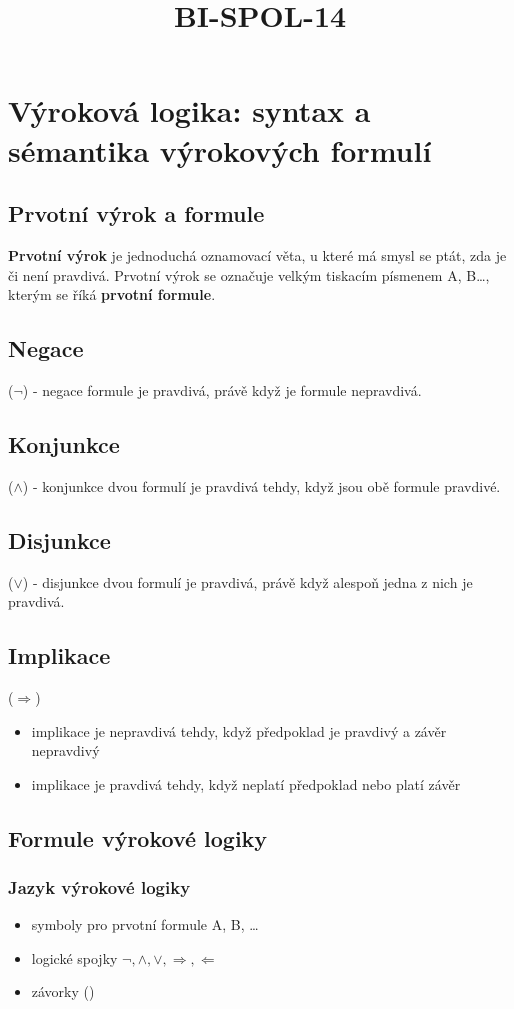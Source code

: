 \documentclass{szzclass}
\begin{document}
\tableofcontents
\newpage

\title{BI-SPOL-14}
\section{Výroková logika: syntax a sémantika výrokových formulí}
\subsection{Prvotní výrok a formule}
\textbf{Prvotní výrok} je jednoduchá oznamovací věta, u které má smysl se ptát, zda je či není pravdivá.
Prvotní výrok se označuje velkým tiskacím písmenem A, B\dots, kterým se říká \textbf{prvotní formule}.
\subsection{Negace}
($\neg$) - negace formule je pravdivá, právě když je formule nepravdivá.
\subsection{Konjunkce}
($\wedge$) - konjunkce dvou formulí je pravdivá tehdy, když jsou obě formule pravdivé.
\subsection{Disjunkce}
($\vee$) - disjunkce dvou formulí je pravdivá, právě když alespoň jedna z nich je pravdivá.
\subsection{Implikace}
($\Rightarrow$)
\begin{itemize}
	\item implikace je nepravdivá tehdy, když předpoklad je pravdivý a závěr nepravdivý
	\item implikace je pravdivá tehdy, když neplatí předpoklad nebo platí závěr
\end{itemize}
\subsection{Formule výrokové logiky}
\subsubsection{Jazyk výrokové logiky}
\begin{itemize}
	\item symboly pro prvotní formule A, B, \dots
	\item logické spojky $\neg, \wedge, \vee, \Rightarrow, \Leftarrow$
	\item závorky ()
\end{itemize}
\end{document}
